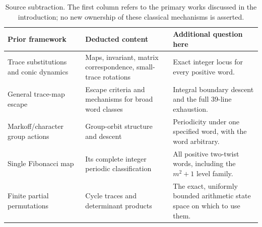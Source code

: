 \begin{table}[tb]
\centering\small
\begin{tabular}{@{}>{\raggedright\arraybackslash}p{}
>{\raggedright\arraybackslash}p{}
>{\raggedright\arraybackslash}p{}@{}}
\toprule
Prior framework & Deducted content & Additional question here\\
\midrule
Trace substitutions and conic dynamics &
Maps, invariant, matrix correspondence, small-trace rotations &
Exact integer locus for every positive word.\\[2pt]
General trace-map escape &
Escape criteria and mechanisms for broad word classes &
Integral boundary descent and the full 39-line exhaustion.\\[2pt]
Markoff/character group actions &
Group-orbit structure and descent &
Periodicity under one specified word, with the word arbitrary.\\[2pt]
Single Fibonacci map &
Its complete integer periodic classification &
All positive two-twist words, including the $m^2+1$ level family.\\[2pt]
Finite partial permutations &
Cycle traces and determinant products &
The exact, uniformly bounded arithmetic state space on which to use them.\\
\bottomrule
\end{tabular}
\caption{Source subtraction. The first column refers to the primary
works discussed in the introduction; no new ownership of these
classical mechanisms is asserted.}
\label{tab:sources}
\end{table}
